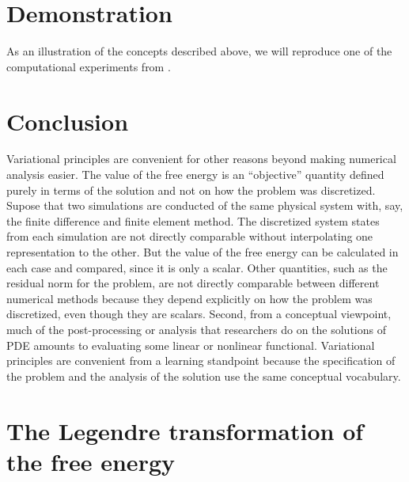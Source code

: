 \documentclass{article}
\theoremstyle{definition}
\theoremstyle{plain}
\begin{document}
\section{Demonstration}

As an illustration of the concepts described above, we will reproduce one of the computational experiments from \citet{roering2008well}.

\section{Conclusion}

Variational principles are convenient for other reasons beyond making numerical analysis easier.
The value of the free energy is an ``objective'' quantity defined purely in terms of the solution and not on how the problem was discretized.
Supose that two simulations are conducted of the same physical system with, say, the finite difference and finite element method.
The discretized system states from each simulation are not directly comparable without interpolating one representation to the other.
But the value of the free energy can be calculated in each case and compared, since it is only a scalar.
Other quantities, such as the residual norm for the problem, are not directly comparable between different numerical methods because they depend explicitly on how the problem was discretized, even though they are scalars.
Second, from a conceptual viewpoint, much of the post-processing or analysis that researchers do on the solutions of PDE amounts to evaluating some linear or nonlinear functional.
Variational principles are convenient from a learning standpoint because the specification of the problem and the analysis of the solution use the same conceptual vocabulary.

\appendix
\section{The Legendre transformation of the free energy}\label{sec:appendix}
\end{document}
